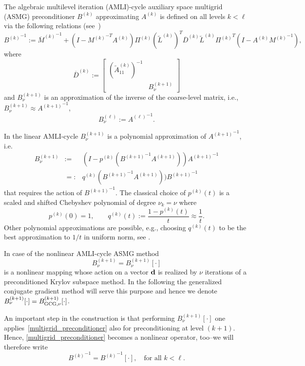 \documentclass[11pt]{amsart}
\numberwithin{equation}{section}
\theoremstyle{definition}\newtheorem{example}{Example}[section]
\begin{document}
The algebraic multilevel iteration (AMLI)-cycle auxiliary space multigrid (ASMG) preconditioner
$B^{(k)}$
approximating $A^{(k)}$ is defined on all levels $k < \ell$ via the following relations
(see~\cite{Kraus_Lymb_Mar_2014})
 \begin{equation}\label{multigrid_preconditioner}
{B^{(k)}}^{-1} := 
{\overline{M}^{(k)}}^{-1} + (I - {M^{(k)}}^{-T} A^{(k)})
\Pi^{(k)} 
 (\widetilde{L}^{(k)})^T  \overline{D}^{(k)}
\widetilde{L}^{(k)} {\Pi^{(k)}}^T (I - A^{(k)} {M^{(k)}}^{-1}),
 \end{equation}
where
\begin{equation}
\overline{D}^{(k)} :=
\left [
\begin{array}{cc}
(\widetilde{A}^{(k)}_{11})^{-1} & \\
& B_{\nu}^{(k+1)}
\end{array}
\right ]
\end{equation}
and $B_{\nu}^{(k+1)}$
is an approximation of the inverse of the coarse-level matrix,
i.e., $B_{\nu}^{(k+1)} \approx {A^{(k+1)}}^{-1}$,
\begin{equation}
B_{\nu}^{(\ell)} := {A^{(\ell)}}^{-1}.
\end{equation} 

In the linear AMLI-cycle $B_{\nu}^{(k+1)}$ is a polynomial approximation of ${A^{(k+1)}}^{-1}$,
i.e. 
$$
\begin{array}{ccc}
 B_{\nu}^{(k+1)} & := & (I-p^{(k)}({B^{(k+1)}}^{-1}A^{(k+1)})){A^{(k+1)}}^{-1} \\
 & =: & q^{(k)}({B^{(k+1)}}^{-1}A^{(k+1)})){B^{(k+1)}}^{-1}
\end{array}
$$
that requires the action of ${B^{(k+1)}}^{-1}$. The classical choice of $p^{(k)}(t)$
is a scaled and shifted Chebyshev polynomial of degree $\nu_k=\nu$ where
$$
p^{(k)}(0)=1,\qquad q^{(k)}(t):=\frac{1-p^{(k)}(t)}{t}\approx \frac{1}{t}.
$$
Other polynomial approximations are possible, e.g., choosing $q^{(k)}(t)$ to be the
best approximation to $1/t$ in uniform norm, see \cite{Kraus2012polynomial}.

In case of the nonlinear AMLI-cycle ASMG method
$$B_{\nu}^{(k+1)}=B_{\nu}^{(k+1)}[\cdot]$$
is a nonlinear mapping whose action on a vector ${{\bf{{d}}}}$ is realized by $\nu$
iterations of a preconditioned Krylov subspace method.
In the following the generalized conjugate gradient method will serve this
purpose and hence we denote $B_{\nu}^{(k+1)}[\cdot]=B^{(k+1)}_{{\rm GCG,\nu}}[\cdot]$.

An important step in the construction is that performing $B_{\nu}^{(k+1)}[\cdot]$
one applies~\eqref{multigrid_preconditioner} also for preconditioning at level $(k+1)$.
Hence, \eqref{multigrid_preconditioner} becomes a nonlinear operator, too--we will
therefore write
$${B^{(k)}}^{-1}={B^{(k)}}^{-1}[\cdot], \quad \mbox{for all } k<\ell.$$
\end{document}
